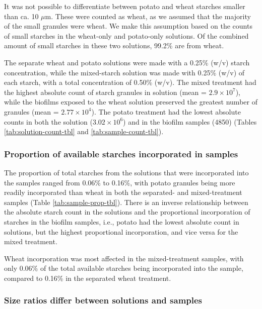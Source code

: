 \documentclass[utf8]{frontiers/frontiersSCNS}
\begin{document}
It was not possible to differentiate between potato and
wheat starches smaller than ca. 10 \(\mu\)m. These were counted as wheat,
as we assumed that the majority of the small granules were wheat. We make this
assumption based on the counts of small starches in the wheat-only and potato-only
solutions. Of the combined amount of small starches in these two solutions,
99.2\%
are from wheat.

The separate wheat and potato solutions were made with a 0.25\% (w/v) starch
concentration, while the mixed-starch solution was made with 0.25\% (w/v) of each
starch, with a total concentration of 0.50\% (w/v).
The mixed treatment had the highest absolute count of starch granules in solution (mean = \ensuremath{2.9\times 10^{7}}),
while the biofilms exposed to the wheat solution preserved the greatest number of
granules
(mean = \ensuremath{2.77\times 10^{4}}).
The potato treatment had the lowest absolute counts in both the solution
(\ensuremath{3.02\times 10^{6}})
and in the biofilm samples
(4850)
(Tables \ref{tab:solution-count-tbl} and \ref{tab:sample-count-tbl}).

\hypertarget{proportion-of-available-starches-incorporated-in-samples}{%
\subsubsection{Proportion of available starches incorporated in samples}\label{proportion-of-available-starches-incorporated-in-samples}}

The proportion of total starches from the solutions that were incorporated
into the samples ranged from
0.06\% to 0.16\%,
with potato granules being more readily incorporated than wheat in both the
separated- and mixed-treatment samples
(Table \ref{tab:sample-prop-tbl}).
There is an inverse relationship between the absolute starch count in the solutions
and the proportional incorporation of starches in the biofilm samples, i.e., potato
had the lowest absolute count in solutions, but the highest proportional
incorporation, and vice versa for the mixed treatment.

Wheat incorporation was most affected in the mixed-treatment samples, with only
0.06\% of the total available starches being incorporated into
the sample, compared to
0.16\%
in the separated wheat treatment.

\hypertarget{size-ratios-differ-between-solutions-and-samples}{%
\subsubsection{Size ratios differ between solutions and samples}\label{size-ratios-differ-between-solutions-and-samples}}
\end{document}
